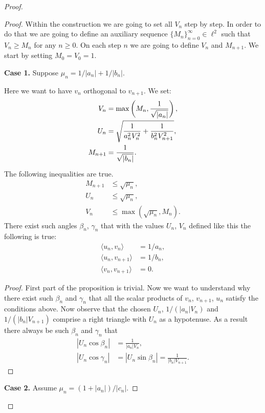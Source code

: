 \documentclass[12pt]{amsart}
\theoremstyle{case}
\begin{document}
\begin{proof}
\begin{proof}
        Within the construction we are going to set all $V_n$ step by step.
        In order to do that we are going to define an auxiliary sequence $\{M_n\}_{n=0}^\infty \in \ell^2$ such that $V_n \geq M_n$ for any $n \geq 0$.
        On each step $n$ we are going to define $V_n$ and $M_{n+1}$.
        We start by setting $M_0 = V_0 = 1$.

        \noindent\textbf{Case 1.} Suppose $\mu_n = 1/|a_n| + 1/|b_n|$.

          Here we want to have $v_n$ orthogonal to $v_{n+1}$.
          We set:
          \begin{align*}
              V_n &= \max\left(M_n, \frac{1}{\sqrt{\smash[b]{|a_n|}}}\right),\\
              U_n &= \sqrt{\frac{1}{a_n^2 V_n^2} + \frac{1}{b_n^2 V_{n+1}^2}},\\
              M_{n+1} &= \frac{1}{\sqrt{\smash[b]{|b_n|}}}.
          \end{align*}
          \begin{prop}
            The following inequalities are true.
            \begin{align*}
              M_{n+1} &\leq \sqrt{\mu_n},\\
              U_n &\leq \sqrt{\mu_n},\\
              V_n &\leq \max(\sqrt{\mu_n}, M_n).
            \end{align*}
            There exist such angles $\beta_n$, $\gamma_n$ that with the values $U_n$, $V_n$ defined like this the following is true:
            \begin{align*}
              \langle u_n, v_n \rangle &= 1/a_n,\\
              \langle u_n, v_{n+1} \rangle &= 1/b_n,\\
              \langle v_n, v_{n+1} \rangle &= 0.
            \end{align*}
          \end{prop}
          \begin{proof}
            First part of the proposition is trivial.
            Now we want to understand why there exist such $\beta_n$ and $\gamma_n$ that all the scalar products of
            $v_n$, $v_{n+1}$, $u_n$ satisfy the conditions above.
            Now observe that the chosen $U_n$, $1/(|a_n| V_n)$ and $1/(|b_n| V_{n+1})$ 
              comprise a right triangle with $U_n$ as a hypotenuse.
            As a result there always be such $\beta_n$ and $\gamma_n$ that
            \begin{align*}
              |U_n \cos{\beta_n}| &= \frac{1}{|a_n|V_n},\\
              \left|U_n \cos{\gamma_n}\right| &= \left|U_n \sin{\beta_n}\right| = \frac{1}{|b_n|V_{n+1}}.
            \end{align*}
          \end{proof}
        \noindent\textbf{Case 2.} Assume $\mu_n = (1 + |a_n|)/|c_n|$.


\end{proof}
\end{proof}
\end{document}
